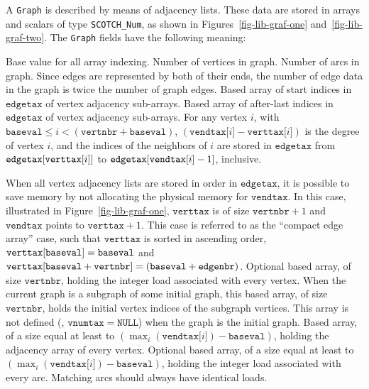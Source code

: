 A \texttt{Graph} is described by means of adjacency lists. These data
are stored in arrays and scalars of type \texttt{SCOTCH\_Num}, as
shown in Figures~\ref{fig-lib-graf-one}
and~\ref{fig-lib-graf-two}. The \texttt{Graph} fields have the
following meaning:
\begin{itemize}
Base value for all array indexing.
Number of vertices in graph.
Number of arcs in graph. Since edges are represented by both of their
ends, the number of edge data in the graph is twice the number of
graph edges.
Based array of start indices in $\mathtt{edgetax}$ of vertex
adjacency sub-arrays.
Based array of after-last indices in $\mathtt{edgetax}$ of vertex
adjacency sub-arrays.
For any vertex $i$, with $\mathtt{baseval} \leq i < (\mathtt{vertnbr}
+ \mathtt{baseval})$, $(\mathtt{vendtax[}i\mathtt{]}
-\mathtt{verttax[}i\mathtt{]})$ is the degree of vertex $i$, and the
indices of the neighbors of $i$ are stored in $\mathtt{edgetax}$ from
$\mathtt{edgetax[\lbt verttax[}i\mathtt{]]}$ to $\mathtt{edgetax[\lbt
vendtax[}i\mathtt{]} - 1\mathtt{]}$, inclusive.

When all vertex adjacency lists are stored in order in
$\mathtt{edgetax}$, it is possible to save memory by not allocating
the physical memory for $\mathtt{vendtax}$. In this case, illustrated
in Figure~\ref{fig-lib-graf-one}, $\mathtt{verttax}$ is of size
$\mathtt{vertnbr} + 1$ and $\mathtt{vendtax}$ points to
$\mathtt{verttax} + 1$. This case is referred to as the ``compact edge
array'' case, such that $\mathtt{verttax}$ is sorted in ascending
order, $\mathtt{verttax[\lbt baseval]} = \mathtt{baseval}$ and
$\mathtt{verttax[\lbt baseval} + \mathtt{vertnbr]} =
(\mathtt{baseval} + \mathtt{edgenbr})$.
Optional based array, of size $\mathtt{vertnbr}$, holding the integer
load associated with every vertex.
When the current graph is a subgraph of some initial graph, this
based array, of size $\mathtt{vertnbr}$, holds the initial vertex
indices of the subgraph vertices. This array is not defined (\ie,
$\mathtt{vnumtax} = \mathtt{NULL}$) when the graph is the initial
graph.
Based array, of a size equal at least to
$\left(\max_{i}(\mathtt{vendtax[}i\mathtt{]}) -
\mathtt{baseval}\right)$, holding the adjacency array of every
vertex.
Optional based array, of a size equal at least to
$\left(\max_{i}(\mathtt{vendtax[} i \mathtt{]}) -
\mathtt{baseval}\right)$, holding the integer load associated with
every arc. Matching arcs should always have identical loads.
\end{itemize}

